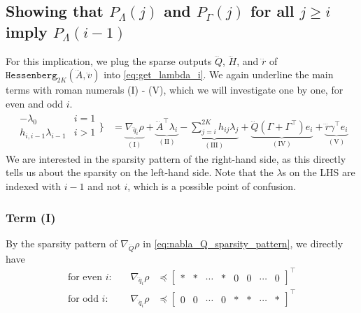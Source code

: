 \documentclass[a4paper,12pt]{article}
\theoremstyle{definition}
\begin{document}
\subsection{Showing that $P_\Lambda(j)$ and $P_\Gamma(j)$ for all $j \geq i$ imply $P_\Lambda(i-1)$}
For this implication, we plug the sparse outputs $\dddot{Q}$, $\dddot{H}$, and $\dddot{r}$ of $\texttt{Hessenberg}_{2K}(\dddot{A}, \dddot{v})$ into \eqref{eq:get_lambda_i}. We again underline the main terms with roman numerals (I) - (V), which we will investigate one by one, for even and odd $i$.
\begin{align}
    \!\!\!\!\!\begin{array}{cc}
        - \lambda_0 & \!\!i = 1 \\
      h_{i, i\!-\!1} \lambda_{i\!-\!1} & \!\!i > 1
   \end{array}\!\!\bigg\} &\!= \!\underbrace{\nabla_{\dddot{q}_i} \rho}_{(\text{I})} + \underbrace{\dddot{A}^\top \lambda_i}_{(\text{II})} - \underbrace{\!\sum_{j=i}^{2K} h_{ij} \lambda_j}_{(\text{III})} + \underbrace{\dddot{Q}(\Gamma + \Gamma^\top)e_i}_{(\text{IV})} + \underbrace{\dddot{r} \gamma^\top e_i}_{(\text{V})} \label{eq:sparse_get_lambda_i}
\end{align}
We are interested in the sparsity pattern of the right-hand side, as this directly tells us about the sparsity on the left-hand side. Note that the $\lambda$s on the LHS are indexed with $i-1$ and not $i$, which is a possible point of confusion.
\subsubsection{Term (I)}
By the sparsity pattern of $\nabla_{\dddot{Q}} \rho$ in \eqref{eq:nabla_Q_sparsity_pattern}, we directly have 
\begin{align}
    \text{for even $i$: } & & \nabla_{\dddot{q}_i} \rho &\preceq \begin{bmatrix} * & * & \cdots &  * & 0 & 0 &\cdots & 0\end{bmatrix} ^\top 
    \\
    \text{for odd $i$: } & & \nabla_{\dddot{q}_i} \rho &\preceq \begin{bmatrix} 0 & 0 & \cdots & 0 & * & * & \cdots & *\end{bmatrix} ^\top
\end{align}
\end{document}
